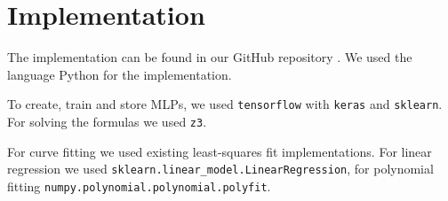 \section{Implementation}
\label{sec:imp}
    The implementation can be found in our GitHub repository \cite{Dirks_mlp_smt_closed}.  We used the language Python for the implementation.\par %
    To create, train and store MLPs, we used \lstinline{tensorflow} with \lstinline{keras} and \lstinline{sklearn}. For solving the formulas we used \lstinline{z3}. \par
    For curve fitting we used existing least-squares fit implementations. For linear regression we used \lstinline{sklearn.linear_model.LinearRegression}, for polynomial fitting \lstinline{numpy.polynomial.polynomial.polyfit}.